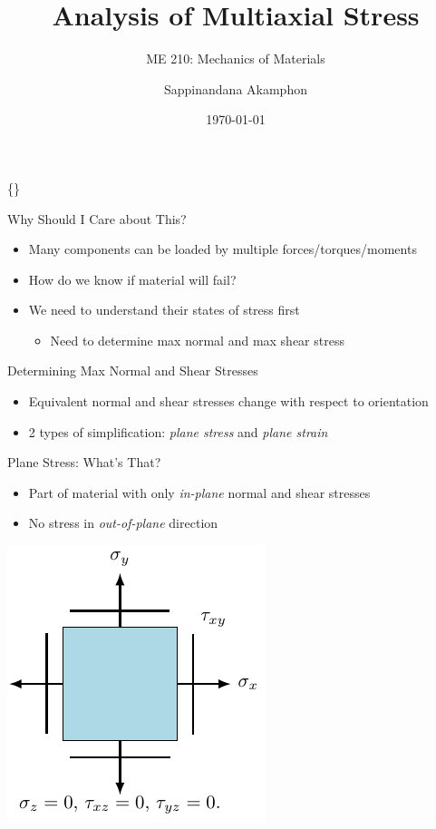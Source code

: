\documentclass[10pt, svgnames]{beamer}
\author{Sappinandana Akamphon}
\date{\today}
\title{Analysis of Multiaxial Stress}
\subtitle{ME 210: Mechanics of Materials}
\institute{Department of Mechanical Engineering, TSE}
\date{}
\begin{document}
\begin{frame}[label={sec:orga0dd01b}]{\{\}}
\maketitle
\end{frame}

\begin{frame}[label={sec:orgbc1b61e}]{Why Should I Care about This?}
\begin{itemize}
\item Many components can be loaded by multiple forces/torques/moments
\item How do we know if material will fail?
\item We need to understand their states of stress first
\begin{itemize}
\item Need to determine max normal and max shear stress
\end{itemize}
\end{itemize}
\end{frame}

\begin{frame}[label={sec:orgd83fa31}]{Determining Max Normal and Shear Stresses}
\begin{itemize}
\item Equivalent normal and shear stresses change with respect to
orientation
\item 2 types of simplification: \emph{plane stress} and \emph{plane strain}
\end{itemize}
\end{frame}

\begin{frame}[label={sec:org7c9ff41}]{Plane Stress: What's That?}
\begin{itemize}
\item Part of material with only \emph{in-plane} normal and shear stresses

\item No stress in \emph{out-of-plane} direction
\end{itemize}

\begin{center}
\includegraphics[height=0.7\textheight]{pictures/plane-stress.pdf}
\end{center}
\end{frame}
\end{document}
